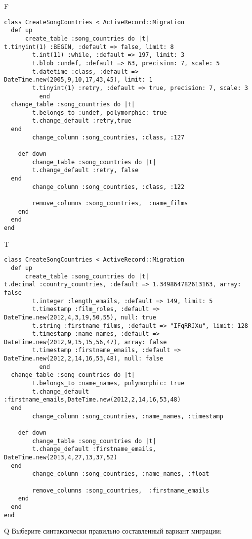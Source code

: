 F
\begin{verbatim}
class CreateSongCountries < ActiveRecord::Migration
  def up
	  create_table :song_countries do |t|
t.tinyint(1) :BEGIN, :default => false, limit: 8
		t.int(11) :while, :default => 197, limit: 3
		t.blob :undef, :default => 63, precision: 7, scale: 5
		t.datetime :class, :default => DateTime.new(2005,9,10,17,43,45), limit: 1
		t.tinyint(1) :retry, :default => true, precision: 7, scale: 3
		  end
  change_table :song_countries do |t|
		t.belongs_to :undef, polymorphic: true
 		t.change_default :retry,true
  end
 		change_column :song_countries, :class, :127
   
	def down
		change_table :song_countries do |t|
		t.change_default :retry, false
  end
 		change_column :song_countries, :class, :122
   
		remove_columns :song_countries,  :name_films 
    end 
  end
end

\end{verbatim}

T
\begin{verbatim}
class CreateSongCountries < ActiveRecord::Migration
  def up
	  create_table :song_countries do |t|
t.decimal :country_countries, :default => 1.349864782613163, array: false
		t.integer :length_emails, :default => 149, limit: 5
		t.timestamp :film_roles, :default => DateTime.new(2012,4,3,19,50,55), null: true
		t.string :firstname_films, :default => "IFqRRJXu", limit: 128
		t.timestamp :name_names, :default => DateTime.new(2012,9,15,15,56,47), array: false
		t.timestamp :firstname_emails, :default => DateTime.new(2012,2,14,16,53,48), null: false
		  end
  change_table :song_countries do |t|
		t.belongs_to :name_names, polymorphic: true
 		t.change_default :firstname_emails,DateTime.new(2012,2,14,16,53,48)
  end
 		change_column :song_countries, :name_names, :timestamp
   
	def down
		change_table :song_countries do |t|
		t.change_default :firstname_emails, DateTime.new(2013,4,27,13,37,52)
  end
 		change_column :song_countries, :name_names, :float
   
		remove_columns :song_countries,  :firstname_emails 
    end 
  end
end

\end{verbatim}

Q
Выберите синтаксически правильно составленный вариант миграции:

